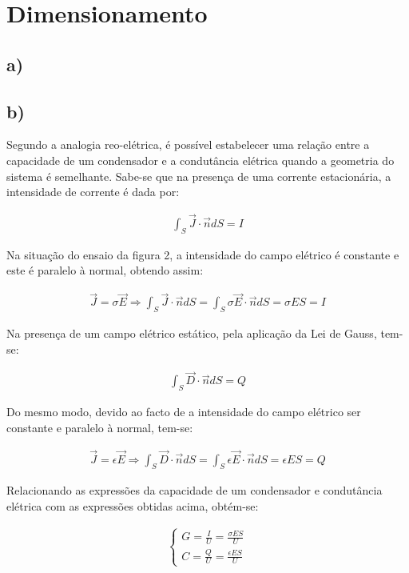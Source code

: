 \documentclass[portuguese, a4paper, titlepage]{article}
\begin{document}
	\section{Dimensionamento}
	\subsection{a)}

	\subsection{b)}
	Segundo a analogia reo-elétrica, é possível estabelecer uma relação entre a capacidade de um condensador e a condutância elétrica quando a geometria do sistema é semelhante.
	Sabe-se que na presença de uma corrente estacionária, a intensidade de corrente é dada por:

	\begin{align*}
		\int _ { S } \vec{J} \cdot \vec{n} d S = I
	\end{align*}

	Na situação do ensaio da figura 2, a intensidade do campo elétrico é constante e este é paralelo à normal, obtendo assim:

	\begin{align*}
		\vec{J} = \sigma \vec{E} \Rightarrow \int _ { S } \vec{J} \cdot \vec{n} d S = \int _ { S } \sigma \vec{E} \cdot \vec{n} d S  = \sigma E S = I
	\end{align*}

	Na presença de um campo elétrico estático, pela aplicação da Lei de Gauss, tem-se:

	\begin{align*}
			\int _ { S } \vec{D} \cdot \vec{n} d S = Q
	\end{align*}

	Do mesmo modo, devido ao facto de a intensidade do campo elétrico ser constante e paralelo à normal, tem-se:

	\begin{align*}
		\vec{J} = \epsilon \vec{E} \Rightarrow \int _ { S } \vec{D} \cdot \vec{n} d S = \int _ { S } \epsilon \vec{E} \cdot \vec{n} d S = \epsilon E S = Q
	\end{align*}

	Relacionando as expressões da capacidade de um condensador e condutância elétrica com as expressões obtidas acima, obtém-se:
	
	\begin{align*}
  		\begin{cases}
			G = \frac{I}{U} = \frac{\sigma E S}{U} \\
    			C =  \frac{Q}{U} = \frac{\epsilon E S}{U}
 		\end{cases}
	\end{align*}
	
\end{document}
